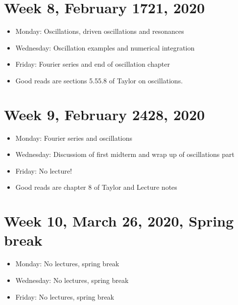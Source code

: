 \documentclass[letterpaper,10pt,english]{sphinxmanual}
\begin{document}
\section{Week 8, February 17\sphinxhyphen{}21, 2020}
\label{\detokenize{intro:week-8-february-17-21-2020}}\begin{itemize}
\item {} 
Monday: Oscillations, driven oscillations and resonances

\item {} 
Wednesday:  Oscillation examples and  numerical integration

\item {} 
Friday: Fourier series and end of oscillation chapter  

\item {} 
Good reads are sections 5.5\sphinxhyphen{}5.8 of Taylor on oscillations.

\end{itemize}


\section{Week 9, February 24\sphinxhyphen{}28, 2020}
\label{\detokenize{intro:week-9-february-24-28-2020}}\begin{itemize}
\item {} 
Monday: Fourier series and oscillations

\item {} 
Wednesday: Discussiom of first midterm and wrap up of oscillations part

\item {} 
Friday:  No lecture!

\item {} 
Good reads are chapter 8 of Taylor and Lecture notes

\end{itemize}


\section{Week 10, March 2\sphinxhyphen{}6, 2020, Spring break}
\label{\detokenize{intro:week-10-march-2-6-2020-spring-break}}\begin{itemize}
\item {} 
Monday:  No lectures, spring break

\item {} 
Wednesday: No lectures, spring break

\item {} 
Friday:  No lectures, spring break

\end{itemize}
\end{document}
